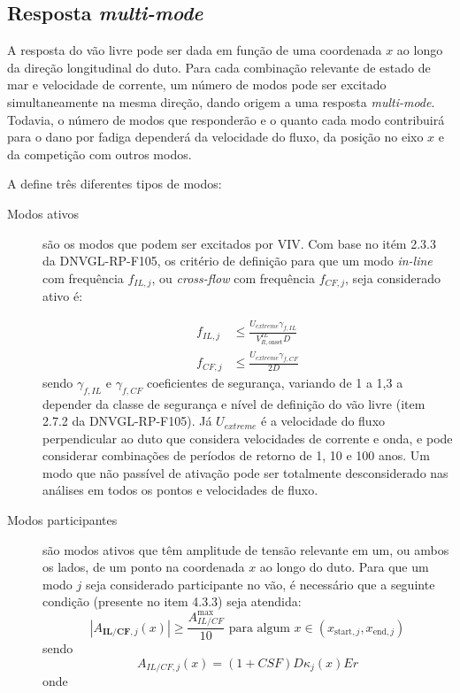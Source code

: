 \subsection{\label{sec:multimode}Resposta \textit{multi-mode}}


A resposta do vão livre pode ser dada em função de uma coordenada $x$ ao longo da direção longitudinal do duto.
Para cada combinação relevante de estado de mar e velocidade de corrente, um número de modos pode ser excitado simultaneamente na mesma direção, dando origem a uma resposta \textit{multi-mode}.
Todavia, o número de modos que responderão e o quanto cada modo contribuirá para o dano por fadiga dependerá da velocidade do fluxo, da posição no eixo $x$ e da competição com outros modos.

A  define três diferentes tipos de modos:
\begin{description}
	\item[Modos ativos] são os modos que podem ser excitados por VIV\@. Com base no itém 2.3.3 da DNVGL-RP-F105, os critério de definição para que um modo \textit{in-line} com frequência $f_{IL,j}$, ou \textit{cross-flow} com frequência $f_{CF,j}$, seja considerado ativo é:

    \begin{equation}
        \begin{aligned}
        f_{I L, j} & \leq \frac{U_{extreme} \gamma_{f,IL}}{V_{R,\text{onset}}^{IL} D} \\
        f_{C F, j} & \leq \frac{U_{extreme} \gamma_{f,CF}}{2D}
        \end{aligned}
    \end{equation}
    sendo $\gamma_{f,IL}$ e $\gamma_{f,CF}$ coeficientes de segurança, variando de 1 a 1,3 a depender da classe de segurança e nível de
    definição do vão livre (item 2.7.2 da DNVGL-RP-F105). Já $U_{extreme}$ é a velocidade do fluxo perpendicular ao duto que considera velocidades de corrente e onda, e pode considerar combinações de períodos de retorno de 1, 10 e 100 anos.
    Um modo que não passível de ativação pode ser totalmente desconsiderado nas análises em todos os pontos e velocidades de fluxo.

    \item[Modos participantes] são modos ativos que têm amplitude de tensão relevante em um, ou ambos os lados, de um ponto na coordenada $x$ ao longo do duto. Para que um modo $j$ seja considerado participante no vão, é necessário que a seguinte condição (presente no item 4.3.3) seja atendida:
    \[
    \left|A_{\textbf{IL/CF}, j}(x)\right| \geq \frac{A_{IL/CF}^{\max}}{10} \text{ para algum } x \in (x_{\text{start},j}, x_{\text{end}, j})
    \]
    sendo
    \[
    A_{IL/CF, j}(x) = (1+CSF) D \kappa_{j}(x) E r
    \]
    onde


\end{description}
